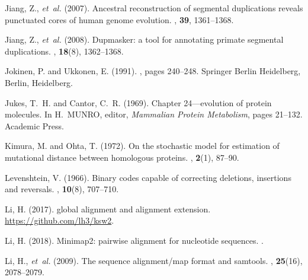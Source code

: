 \documentclass{article}
\begin{document}
\begin{thebibliography}{}
Jiang, Z., {\em et~al.} (2007).
\newblock Ancestral reconstruction of segmental duplications reveals punctuated
  cores of human genome evolution.
, {\bf 39}, 1361--1368.

Jiang, Z., {\em et~al.} (2008).
\newblock Dupmasker: a tool for annotating primate segmental duplications.
, {\bf 18}(8), 1362--1368.

Jokinen, P. and Ukkonen, E. (1991).
, pages 240--248.
\newblock Springer Berlin Heidelberg, Berlin, Heidelberg.

Jukes, T.~H. and Cantor, C.~R. (1969).
\newblock Chapter 24---evolution of protein molecules.
\newblock In H.~MUNRO, editor, {\em Mammalian Protein Metabolism\/}, pages
  21--132. Academic Press.

Kimura, M. and Ohta, T. (1972).
\newblock On the stochastic model for estimation of mutational distance between
  homologous proteins.
, {\bf 2}(1), 87--90.

Levenshtein, V. (1966).
\newblock Binary codes capable of correcting deletions, insertions and
  reversals.
, {\bf 10}(8), 707--710.

Li, H. (2017).
 global alignment and alignment extension.
\newblock \url{https://github.com/lh3/ksw2}.

Li, H. (2018).
\newblock Minimap2: pairwise alignment for nucleotide sequences.
.

Li, H., {\em et~al.} (2009).
\newblock The sequence alignment/map format and samtools.
, {\bf 25}(16), 2078--2079.


\end{thebibliography}
\end{document}
